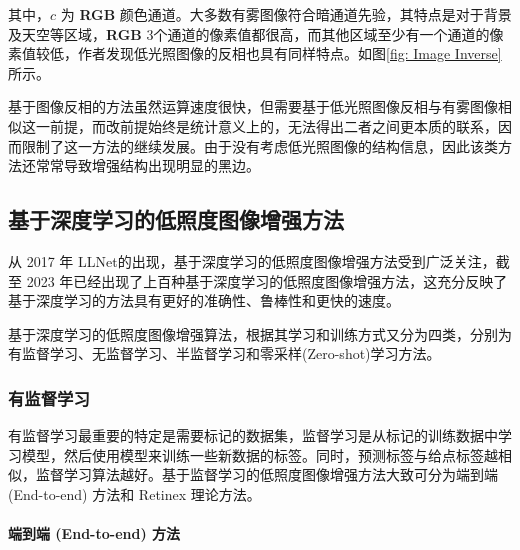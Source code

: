 \documentclass[a4paper]{ctexart}
\begin{document}
	其中，$c$ 为 \textbf{RGB} 颜色通道。大多数有雾图像符合暗通道先验，其特点是对于背景及天空等区域，\textbf{RGB} 3个通道的像素值都很高，而其他区域至少有一个通道的像素值较低，作者发现低光照图像的反相也具有同样特点。如图\ref{fig: Image Inverse}所示。
	
	基于图像反相的方法虽然运算速度很快，但需要基于低光照图像反相与有雾图像相似这一前提，而改前提始终是统计意义上的，无法得出二者之间更本质的联系，因而限制了这一方法的继续发展。由于没有考虑低光照图像的结构信息，因此该类方法还常常导致增强结构出现明显的黑边。
	
	\subsection{基于深度学习的低照度图像增强方法}
	
	从 2017 年 LLNet\cite{lore2017llnet}的出现，基于深度学习的低照度图像增强方法受到广泛关注，截至 2023 年已经出现了上百种基于深度学习的低照度图像增强方法，这充分反映了基于深度学习的方法具有更好的准确性、鲁棒性和更快的速度。
	
	基于深度学习的低照度图像增强算法，根据其学习和训练方式又分为四类，分别为有监督学习、无监督学习、半监督学习和零采样(Zero-shot)学习方法\cite{tang2023low}。
	
	\subsubsection{有监督学习}
	
	有监督学习最重要的特定是需要标记的数据集，监督学习是从标记的训练数据中学习模型，然后使用模型来训练一些新数据的标签。同时，预测标签与给点标签越相似，监督学习算法越好。基于监督学习的低照度图像增强方法大致可分为端到端 (End-to-end) 方法和 Retinex 理论方法。
	
	\paragraph{端到端 (End-to-end) 方法}
	
\end{document}
